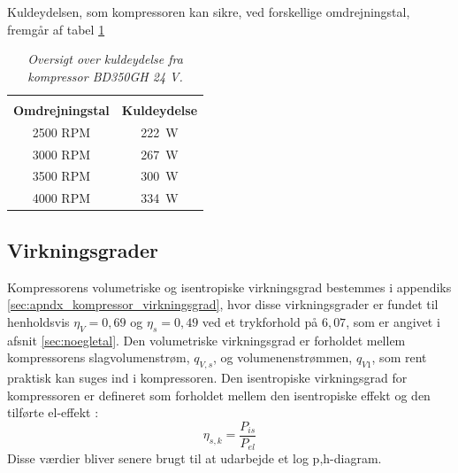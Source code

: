 \documentclass[../Hovedrapport.tex]{subfiles}
\begin{document}
\newpage
Kuldeydelsen, som kompressoren kan sikre, ved forskellige omdrejningstal, fremgår af tabel \ref{tab:Kompressor_koleydelse_Data} 
\begin{table}[H] 
	\centering
	\begin{tabular}{|c|c|}  \cline{1-2} \rowcolor[gray]{0.7} \hline
	\multicolumn{2}{|c|}{\textbf{Kompressorens kuldeydelse}}      \\ \cline{1-2} \rowcolor[gray]{.8} \hline
	\textbf{  Omdrejningstal  }   & \textbf{  Kuldeydelse  }        \\ \cline{1-2}
	2500 RPM        & \SI{222}{\watt}                               \\ \cline{1-2} 
	3000 RPM        & \SI{267}{\watt}                               \\ \cline{1-2} 
	3500 RPM        & \SI{300}{\watt}                               \\ \cline{1-2} 
	4000 RPM        & \SI{334}{\watt}                               \\ \cline{1-2}
	\end{tabular} 
	\caption{\textit{Oversigt over kuldeydelse fra kompressor BD350GH 24 V.}} 
	\label{tab:Kompressor_koleydelse_Data} 
	\vspace{-20pt}
\end{table}
\subsection*{Virkningsgrader} 
\label{sec:virkgrad}
Kompressorens volumetriske og isentropiske virkningsgrad bestemmes i appendiks \ref{sec:apndx_kompressor_virkningsgrad}, hvor disse virkningsgrader er fundet til henholdsvis $\eta_{V}=0,69$ og $\eta_{s}=0,49$ ved et trykforhold på $6,07$, som er angivet i afsnit \ref{sec:noegletal}. Den volumetriske virkningsgrad er forholdet mellem kompressorens slagvolumenstrøm, $q_{V,s}$, og volumenenstrømmen, $q_{V1}$, som rent praktisk kan suges ind i kompressoren. Den isentropiske virkningsgrad for kompressoren er defineret som forholdet mellem den isentropiske effekt og den tilførte el-effekt \citep{termo}:
\begin{equation}
    \eta_{s,k}=\frac{P_{is}}{P_{el}}
\end{equation}
Disse værdier bliver senere brugt til at udarbejde et log p,h-diagram.
\end{document}
